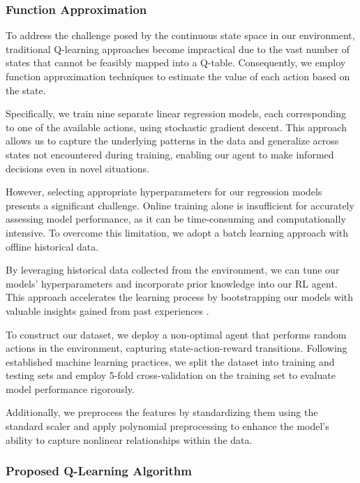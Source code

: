 \subsubsection{Function Approximation}

To address the challenge posed by the continuous state space in our environment, traditional Q-learning approaches become impractical due to the vast number of states that cannot be feasibly mapped into a Q-table. Consequently, we employ function approximation techniques to estimate the value of each action based on the state.

Specifically, we train nine separate linear regression models, each corresponding to one of the available actions, using stochastic gradient descent. This approach allows us to capture the underlying patterns in the data and generalize across states not encountered during training, enabling our agent to make informed decisions even in novel situations.

However, selecting appropriate hyperparameters for our regression models presents a significant challenge. Online training alone is insufficient for accurately assessing model performance, as it can be time-consuming and computationally intensive. To overcome this limitation, we adopt a batch learning approach with offline historical data.

By leveraging historical data collected from the environment, we can tune our models' hyperparameters and incorporate prior knowledge into our RL agent. This approach accelerates the learning process by bootstrapping our models with valuable insights gained from past experiences \cite{cano2017curator,vukosi2015improved}.

To construct our dataset, we deploy a non-optimal agent that performs random actions in the environment, capturing state-action-reward transitions. Following established machine learning practices, we split the dataset into training and testing sets and employ 5-fold cross-validation on the training set to evaluate model performance rigorously.

Additionally, we preprocess the features by standardizing them using the standard scaler and apply polynomial preprocessing to enhance the model's ability to capture nonlinear relationships within the data.


\subsubsection{Proposed Q-Learning Algorithm}

